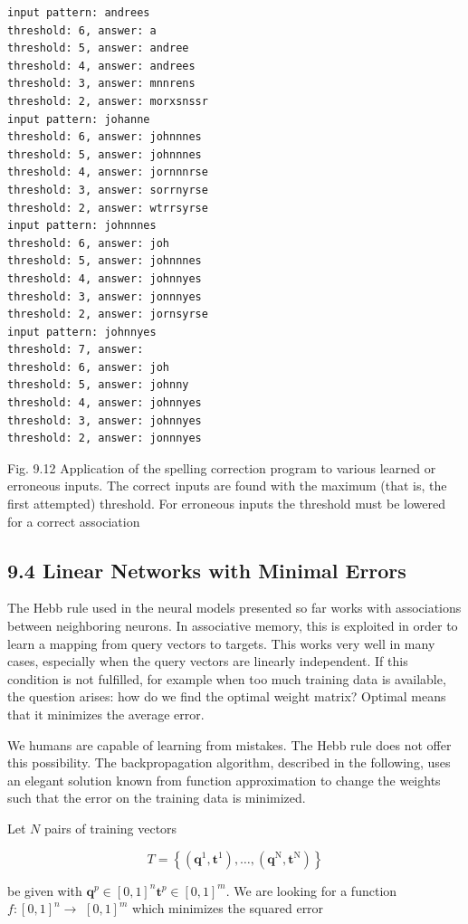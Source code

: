 \documentclass[10pt]{book}
\begin{document}
\begin{center}
\begin{enumerate}
\begin{center}
\begin{center}
\begin{center}
\begin{verbatim}
input pattern: andrees
threshold: 6, answer: a
threshold: 5, answer: andree
threshold: 4, answer: andrees
threshold: 3, answer: mnnrens
threshold: 2, answer: morxsnssr
input pattern: johanne
threshold: 6, answer: johnnnes
threshold: 5, answer: johnnnes
threshold: 4, answer: jornnnrse
threshold: 3, answer: sorrnyrse
threshold: 2, answer: wtrrsyrse
input pattern: johnnnes
threshold: 6, answer: joh
threshold: 5, answer: johnnnes
threshold: 4, answer: johnnyes
threshold: 3, answer: jonnnyes
threshold: 2, answer: jornsyrse
input pattern: johnnyes
threshold: 7, answer:
threshold: 6, answer: joh
threshold: 5, answer: johnny
threshold: 4, answer: johnnyes
threshold: 3, answer: johnnyes
threshold: 2, answer: jonnnyes
\end{verbatim}

Fig. 9.12 Application of the spelling correction program to various learned or erroneous inputs. The correct inputs are found with the maximum (that is, the first attempted) threshold. For erroneous inputs the threshold must be lowered for a correct association

\subsection*{9.4 Linear Networks with Minimal Errors}
The Hebb rule used in the neural models presented so far works with associations between neighboring neurons. In associative memory, this is exploited in order to learn a mapping from query vectors to targets. This works very well in many cases, especially when the query vectors are linearly independent. If this condition is not fulfilled, for example when too much training data is available, the question arises: how do we find the optimal weight matrix? Optimal means that it minimizes the average error.


We humans are capable of learning from mistakes. The Hebb rule does not offer this possibility. The backpropagation algorithm, described in the following, uses an elegant solution known from function approximation to change the weights such that the error on the training data is minimized.

Let $N$ pairs of training vectors

$$
T=\left\{\left(\boldsymbol{q}^{1}, \boldsymbol{t}^{1}\right), \ldots,\left(\boldsymbol{q}^{\mathrm{N}}, \boldsymbol{t}^{\mathrm{N}}\right)\right\}
$$

be given with $\boldsymbol{q}^{p} \in[0,1]^{n} \boldsymbol{t}^{p} \in[0,1]^{m}$. We are looking for a function $f:[0,1]^{n} \rightarrow$ $[0,1]^{m}$ which minimizes the squared error


\end{center}
\end{center}
\end{center}
\end{enumerate}
\end{center}
\end{document}
